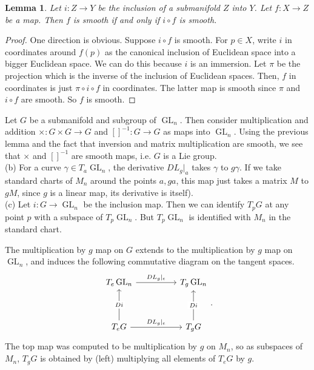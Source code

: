 \documentclass{amsart}
\numberwithin{equation}{section}
\theoremstyle{plain}
\newtheorem{lemma}[theorem]{Lemma}
\theoremstyle{definition}
\theoremstyle{remark}
\renewcommand{\_}[2]{\underbrace{#1}_{#2}}
\renewcommand{\^}[2]{\overbrace{#1}_{#2}}
\newcommand{\GL}{\operatorname{GL}}
\begin{document}
\begin{lemma}
  Let $i:Z \to Y$ be the inclusion of a submanifold $Z$ into $Y$. Let $f:X \to Z$ be a map. Then $f$ is smooth if and only if $i\circ f$ is smooth.
\end{lemma}
\begin{proof}
  One direction is obvious. Suppose $i\circ f$ is smooth. For $p \in X$, write $i$ in coordinates around $f(p)$ as the canonical inclusion of Euclidean space into a bigger Euclidean space. We can do this because $i$ is an immersion. Let $\pi$ be the projection which is the inverse of the inclusion of Euclidean spaces. Then, $f$ in coordinates is just $\pi \circ i\circ f$ in coordinates. The latter map is smooth since $\pi$ and $i\circ f$ are smooth. So $f$ is smooth. 
\end{proof}

Let $G$ be a submanifold and subgroup of $\GL_n$. Then consider multiplication and addition $\times: G\times G\to G$ and $[]^{-1}: G\to G$ as maps into $\GL_n$. Using the previous lemma and the fact that inversion and matrix multiplication are smooth, we see that $\times$ and $[]^{-1}$ are smooth maps, i.e. $G$ is a Lie group.\\

(b) For a curve $\gamma \in T_a\GL_n$, the derivative $DL_g|_a$ takes $\gamma$ to $g \gamma$. If we take standard charts of $M_n$ around the points $a, ga$, this map just takes a matrix $M$ to $gM$, since $g$ is a linear map, its derivative is itself).\\

(c) Let $i:G\to \GL_n$ be the inclusion map. Then we can identify $T_pG$ at any point $p$ with a subspace of $T_p\GL_n$. But $T_p\GL_n$ is identified with $M_n$ in the standard chart.

The multiplication by $g$ map on $G$ extends to the multiplication by $g$ map on $\GL_n$, and induces the following commutative diagram on the tangent spaces.
\[\begin{tikzcd}
	{T_e\GL_n} && {T_g\GL_n} \\
	\\
	{T_eG} && {T_gG}
	\arrow["{DL_g|_e}", from=1-1, to=1-3]
	\arrow["Di"{description}, from=3-1, to=1-1]
	\arrow["{DL_g|_e}", from=3-1, to=3-3]
	\arrow["Di"{description}, from=3-3, to=1-3]
      \end{tikzcd}.\]
The top map was computed to be multiplication by $g$ on $M_n$, so as subspaces of $M_n$, $T_gG$ is obtained by (left) multiplying all elements of $T_eG$ by $g$.\\
\end{document}
